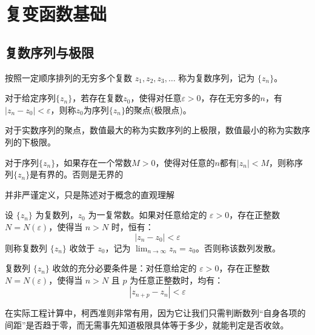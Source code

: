 \chapter{复变函数基础}

\section{复数序列与极限}

\begin{definition}[复数序列]
    按照一定顺序排列的无穷多个复数 $z_1, z_2, z_3, \ldots$ 称为复数序列，记为 $\{z_n\}$。
\end{definition}

\begin{definition}[聚点(极限点)]
    对于给定序列$\{z_n\}$，若存在复数$z_0$，使得对任意$\varepsilon>0$，存在无穷多的$n$，有$|z_n-z_0|<\varepsilon$，则称$z_0$为序列$\{z_n\}$的聚点(极限点)。
\end{definition}

\begin{definition}
    对于实数序列的聚点，数值最大的称为实数序列的上极限，数值最小的称为实数序列的下极限。
\end{definition}

\begin{definition}[有界性]
    对于序列$\{z_n\}$，如果存在一个常数$M>0$，使得对任意的$n$都有$|z_n|<M$，则称序列$\{z_n\}$是有界的。否则是无界的
\end{definition}

\begin{remark}
    并非严谨定义，只是陈述对于概念的直观理解
\end{remark}

\begin{definition}[数列的极限]
设 \(\{z_n\}\) 为复数列，\(z_0\) 为一复常数。如果对任意给定的 \(\varepsilon > 0\)，存在正整数 \(N = N(\varepsilon)\)，使得当 \(n > N\) 时，恒有：
\[
|z_n - z_0| < \varepsilon
\]
则称复数列 \(\{z_n\}\) 收敛于 \(z_0\)，记为 \(\lim_{n \to \infty} z_n = z_0\)。否则称该数列发散。
\end{definition}


\begin{theorem}[柯西收敛准则]
复数列 \(\{z_n\}\) 收敛的充分必要条件是：对任意给定的 \(\varepsilon > 0\)，存在正整数 \(N = N(\varepsilon)\)，使得当 \(n > N\) 且 \(p\) 为任意正整数时，均有：
\[
|z_{n+p} - z_n| < \varepsilon
\]
\end{theorem}
\begin{remark}
在实际工程计算中，柯西准则非常有用，因为它让我们只需判断数列“自身各项的间距”是否趋于零，而无需事先知道极限具体等于多少，就能判定是否收敛。
\end{remark}

